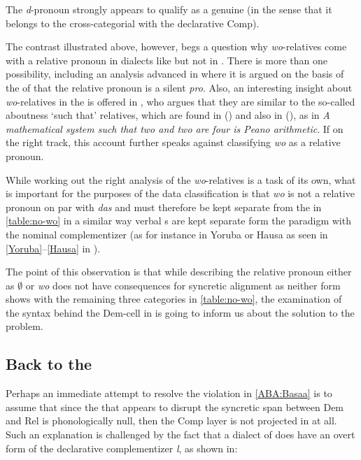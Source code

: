 The \textit{d}-pronoun strongly appears to qualify as a genuine  (in the sense that it belongs to the cross-categorial  with the declarative Comp).
\par
The contrast illustrated above, however, begs a question why \textit{wo}-relatives come with a relative pronoun in dialects like  but not in . 
There is more than one possibility, including an analysis advanced in \citet{PennerBader1995} where it is argued on the basis of the  of  that the relative pronoun is a silent \textit{pro}. Also, an interesting insight about \textit{wo}-relatives in the  is offered in \citet{vanR2003}, who argues that they are similar to the so-called aboutness `such that' relatives, which are found in  (\citealt[257]{Kuno1973}) and also in  (\citealt[157]{Grosu2002}), as in \textit{A mathematical system such that two and two are four is Peano arithmetic}. If on the right track, this account further speaks against classifying \textit{wo} as a relative pronoun.
\par
While working out the right analysis of the \textit{wo}-relatives is a task of its own, what is important for the purposes of the data classification is that \textit{wo} is not a relative pronoun on par with \textit{das} and must therefore be kept separate from the  in \ref{table:no-wo} in a similar way verbal s are kept separate form the paradigm with the nominal complementizer (as for instance in Yoruba or Hausa as seen in \ref{Yoruba}--\ref{Hausa} in ).
\par
The point of this observation is that while describing the  relative pronoun either as $\emptyset$ or \textit{wo} does not have consequences for syncretic alignment as neither form shows  with the remaining three categories in \ref{table:no-wo}, the examination of the syntax behind the Dem-cell in  is going to inform us about the solution to the  problem. 

\subsection{Back to the  } 

Perhaps an immediate attempt to resolve the  violation in \ref{ABA:Basaa} is to assume that since the  that appears to disrupt the syncretic span between Dem and Rel is phonologically null, then the Comp layer is not projected in  at all. Such an explanation is challenged by the fact that a dialect of  does have an overt form of the declarative complementizer \textit{l}, as shown in: 

